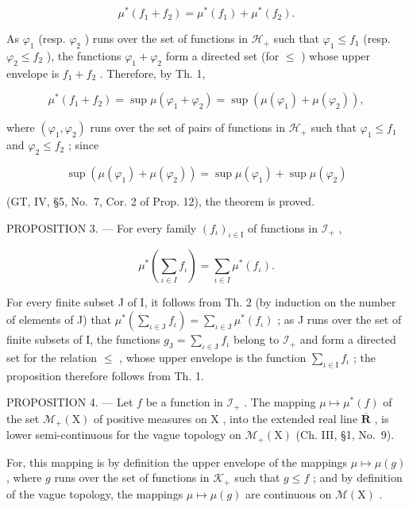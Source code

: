 \[
\mu^ {*} (f _ {1} + f _ {2}) = \mu^ {*} (f _ {1}) + \mu^ {*} (f _ {2}).\tag{3}
\]

As \(\varphi_{1}\) (resp. \(\varphi_{2}\) ) runs over the set of functions in \(\mathcal{H}_{+}\) such that \(\varphi_{1} \leqslant f_{1}\) (resp. \(\varphi_{2} \leqslant f_{2}\) ), the functions \(\varphi_{1} + \varphi_{2}\) form a directed set (for \(\leqslant\) ) whose upper envelope is \(f_{1} + f_{2}\) . Therefore, by Th. 1,

\[
\mu^ {*} (f _ {1} + f _ {2}) = \sup \mu (\varphi_ {1} + \varphi_ {2}) = \sup \left(\mu (\varphi_ {1}) + \mu (\varphi_ {2})\right),
\]

where \((\varphi_{1},\varphi_{2})\) runs over the set of pairs of functions in \(\mathcal{H}_{+}\) such that \(\varphi_1\leqslant f_1\) and \(\varphi_{2}\leqslant f_{2}\) ; since

\[
\sup \left(\mu (\varphi_ {1}) + \mu (\varphi_ {2})\right) = \sup \mu (\varphi_ {1}) + \sup \mu (\varphi_ {2})
\]

(GT, IV, §5, No.~7, Cor. 2 of Prop. 12), the theorem is proved.

PROPOSITION 3. --- For every family \((f_{\iota})_{\iota \in \mathrm{I}}\) of functions in \(\mathcal{I}_{+}\) ,

\[
\mu^ {*} \left(\sum_ {\iota \in I} f _ {\iota}\right) = \sum_ {\iota \in I} \mu^ {*} (f _ {\iota}).\tag{4}
\]

For every finite subset J of I, it follows from Th. 2 (by induction on the number of elements of J) that \(\mu^{*}\left(\sum_{\iota \in \mathrm{J}}f_{\iota}\right) = \sum_{\iota \in \mathrm{J}}\mu^{*}(f_{\iota})\) ; as J runs over the set of finite subsets of I, the functions \(g_{\mathrm{J}} = \sum_{\iota \in \mathrm{J}}f_{\iota}\) belong to \(\mathcal{I}_{+}\) and form a directed set for the relation \(\leqslant\) , whose upper envelope is the function \(\sum_{\iota \in \mathrm{I}}f_{\iota}\) ; the proposition therefore follows from Th. 1.

PROPOSITION 4. --- Let \(f\) be a function in \(\mathcal{I}_{+}\) . The mapping \(\mu \mapsto \mu^{*}(f)\) of the set \(\mathcal{M}_{+}(\mathrm{X})\) of positive measures on \(\mathrm{X}\) , into the extended real line \(\overline{\mathbf{R}}\) , is lower semi-continuous for the vague topology on \(\mathcal{M}_{+}(\mathrm{X})\) (Ch. III, §1, No.~9).

For, this mapping is by definition the upper envelope of the mappings \(\mu \mapsto \mu(g)\) , where \(g\) runs over the set of functions in \(\mathcal{K}_{+}\) such that \(g \leqslant f\) ; and by definition of the vague topology, the mappings \(\mu \mapsto \mu(g)\) are continuous on \(\mathcal{M}(\mathrm{X})\) .


